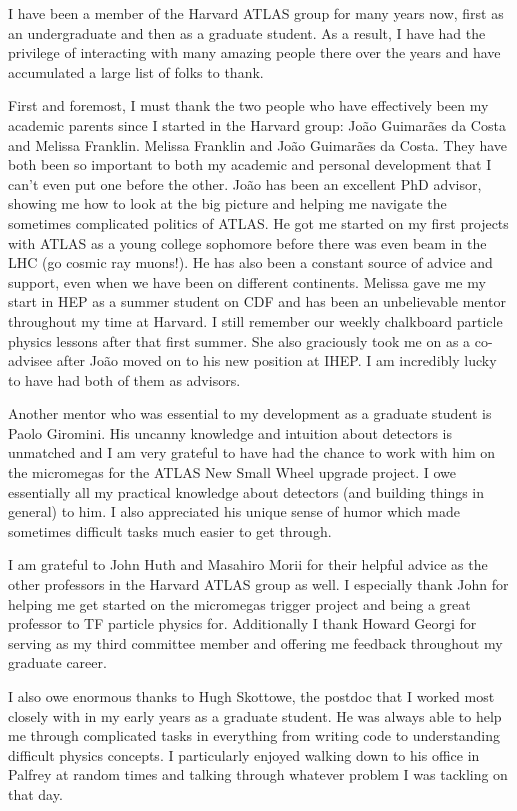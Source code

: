 \begin{doublespace}
I have been a member of the Harvard ATLAS group for many years now, first as an undergraduate and then as a graduate student. As a result, I have had the privilege of interacting with many amazing people there over the years and have accumulated a large list of folks to thank. 

First and foremost, I must thank the two people who have effectively been my academic parents since I started in the Harvard group: Jo\~{a}o Guimar\~{a}es da Costa and Melissa Franklin. Melissa Franklin and Jo\~{a}o Guimar\~{a}es da Costa. They have both been so important to both my academic and personal development that I can't even put one before the other. Jo\~{a}o has been an excellent PhD advisor, showing me how to look at the big picture and helping me navigate the sometimes complicated politics of ATLAS. He got me started on my first projects with ATLAS as a young college sophomore before there was even beam in the LHC (go cosmic ray muons!). He has also been a constant source of advice and support, even when we have been on different continents. Melissa gave me my start in HEP as a summer student on CDF and has been an unbelievable mentor throughout my time at Harvard. I still remember our weekly chalkboard particle physics lessons after that first summer. She also graciously took me on as a co-advisee after Jo\~{a}o moved on to his new position at IHEP. I am incredibly lucky to have had both of them as advisors. 

Another mentor who was essential to my development as a graduate student is Paolo Giromini. His uncanny knowledge and intuition about detectors is unmatched and I am very grateful to have had the chance to work with him on the micromegas for the ATLAS New Small Wheel upgrade project. I owe essentially all my practical knowledge about detectors (and building things in general) to him. I also appreciated his unique sense of humor which made sometimes difficult tasks much easier to get through.

I am grateful to John Huth and Masahiro Morii for their helpful advice as the other professors in the Harvard ATLAS group as well. I especially thank John for helping me get started on the micromegas trigger project and being a great professor to TF particle physics for. Additionally I thank Howard Georgi for serving as my third committee member and offering me feedback throughout my graduate career. 

I also owe enormous thanks to Hugh Skottowe, the postdoc that I worked most closely with in my early years as a graduate student. He was always able to help me through complicated tasks in everything from writing code to understanding difficult physics concepts. I particularly enjoyed walking down to his office in Palfrey at random times and talking through whatever problem I was tackling on that day. 


\end{doublespace}
